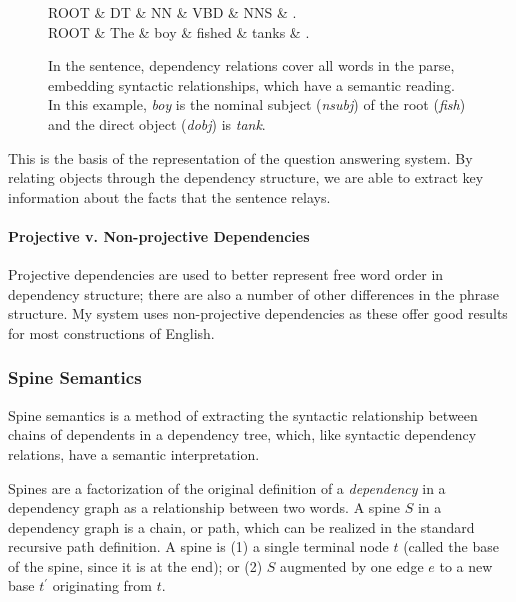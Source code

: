\documentclass[twoside]{article}
\begin{document}
\begin{figure}
\centering
\caption{In the sentence, dependency relations cover all words in the parse, embedding syntactic relationships, which have a semantic reading.  In this example, \textit{boy} is the nominal subject (\textit{nsubj}) of the root (\textit{fish}) and the direct object (\textit{dobj}) is \textit{tank}.} \label{fig:deps}
\begin{dependency}[edge horizontal padding=10pt]\begin{deptext}[column sep=0.3cm]ROOT \& DT \& NN \& VBD \& NNS \& .\\ROOT \& The \& boy \& fished \& tanks \& .\\\end{deptext}\end{dependency}
\end{figure}

This is the basis of the representation of the question answering system.  By relating objects through the dependency structure, we are able to extract key information about the facts that the sentence relays.

\paragraph{Projective v. Non-projective Dependencies} Projective dependencies are used to better represent free word order in dependency structure; there are also a number of other differences in the phrase structure.  My system uses non-projective dependencies as these offer good results for most constructions of English.

\subsubsection{Spine Semantics}

Spine semantics is a method of extracting the syntactic relationship between chains of dependents in a dependency tree, which, like syntactic dependency relations, have a semantic interpretation.

Spines are a factorization of the original definition of a \textit{dependency} in a dependency graph as a relationship between two words.  A spine $S$ in a dependency graph is a chain, or path, which can be realized in the standard recursive path definition.  A spine is (1) a single terminal node $t$ (called the base of the spine, since it is at the end); or (2) $S$ augmented by one edge $e$ to a new base $t^\prime$ originating from $t$.
\end{document}
